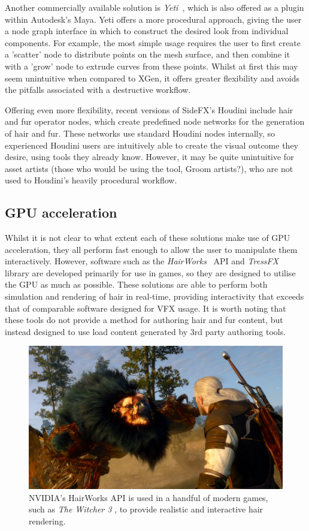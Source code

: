 \documentclass[]{acmsiggraph}
\begin{document}
Another commercially available solution is \textit{Yeti}~\cite{yeti}, which is also offered as a plugin within Autodesk's Maya. Yeti offers a more procedural approach, giving the user a node graph interface in which to construct the desired look from individual components. For example, the most simple usage requires the user to first create a 'scatter' node to distribute points on the mesh surface, and then combine it with a 'grow' node to extrude curves from these points. Whilst at first this may seem unintuitive when compared to XGen, it offers greater flexibility and avoids the pitfalls associated with a destructive workflow.

Offering even more flexibility, recent versions of SideFX's Houdini include hair and fur operator nodes, which create predefined node networks for the generation of hair and fur. These networks use standard Houdini nodes internally, so experienced Houdini users are intuitively able to create the visual outcome they desire, using tools they already know. However, it may be quite unintuitive for asset artists (those who would be using the tool, Groom artists?), who are not used to Houdini's heavily procedural workflow.

\subsection{GPU acceleration} \label{sec:existingGPU}
Whilst it is not clear to what extent each of these solutions make use of GPU acceleration, they all perform fast enough to allow the user to manipulate them interactively. However, software such as the \textit{HairWorks}~\cite{hairworks} API and \textit{TressFX}~\cite{tressfx} library are developed primarily for use in games, so they are designed to utilise the GPU as much as possible. These solutions are able to perform both simulation and rendering of hair in real-time, providing interactivity that exceeds that of comparable software designed for VFX usage. It is worth noting that these tools do not provide a method for authoring hair and fur content, but instead designed to use load content generated by 3rd party authoring tools.

\begin{figure}[htbp]\centering
\includegraphics[width=1.0\linewidth]{images/hairworks}
\caption{\label{figure:hairworks} NVIDIA's HairWorks API is used in a handful of modern games, such as \textit{The Witcher 3} \protect\cite{witcher}, to provide realistic and interactive hair rendering.}
\end{figure}
\end{document}

